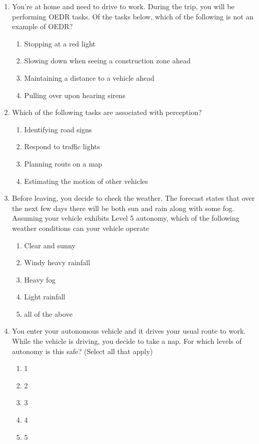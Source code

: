 \begin{enumerate}

\item You’re at home and need to drive to work. During the trip, you will be performing OEDR tasks. Of the tasks below, which of the following is not an example of OEDR? 
\begin{enumerate}
\item Stopping at a red light
\item Slowing down when seeing a construction zone ahead
\item Maintaining a distance to a vehicle ahead
\item Pulling over upon hearing sirens
\end{enumerate}

\item Which of the following tasks are associated with perception? 

\begin{enumerate}
\item Identifying road signs
\item Respond to traffic lights
\item Planning routs on a map
\item Estimating the motion of other vehicles
\end{enumerate}

\item Before leaving, you decide to check the weather. The forecast states that over the next few days there will be both sun and rain along with some fog. Assuming your vehicle exhibits Level 5 autonomy, which of the following weather conditions can your vehicle operate

\begin{enumerate}
\item Clear and sunny
\item Windy heavy rainfall
\item Heavy fog
\item Light rainfall
\item all of the above
\end{enumerate}

\item You enter your autonomous vehicle and it drives your usual route to work. While the vehicle is driving, you decide to take a nap. For which levels of autonomy is this safe? (Select all that apply) 


\begin{enumerate}
\item 1
\item 2
\item 3
\item 4
\item 5
\end{enumerate}


\end{enumerate}

